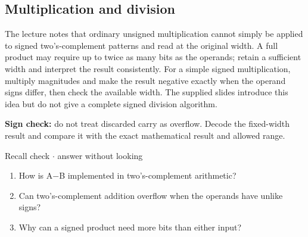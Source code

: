 \documentclass[11pt]{article}
\begin{document}
\begin{keepsection}
\begin{keepsection}
\subsection{Multiplication and division}

The lecture notes that ordinary unsigned multiplication cannot simply be applied to signed two’s-complement patterns and read at the original width. A full product may require up to twice as many bits as the operands; retain a sufficient width and interpret the result consistently. For a simple signed multiplication, multiply magnitudes and make the result negative exactly when the operand signs differ, then check the available width. The supplied slides introduce this idea but do not give a complete signed division algorithm.

\begin{notebox}\textbf{Sign check:} do not treat discarded carry as overflow. Decode the fixed-width result and compare it with the exact mathematical result and allowed range.\end{notebox}

\begin{recallbox}{Recall check \ensuremath{\cdot} answer without looking}
\begin{enumerate}
\item How is A\ensuremath{-}B implemented in two’s-complement arithmetic?
\item Can two’s-complement addition overflow when the operands have unlike signs?
\item Why can a signed product need more bits than either input?
\end{enumerate}

\end{recallbox}
\end{keepsection}
\end{keepsection}
\end{document}
